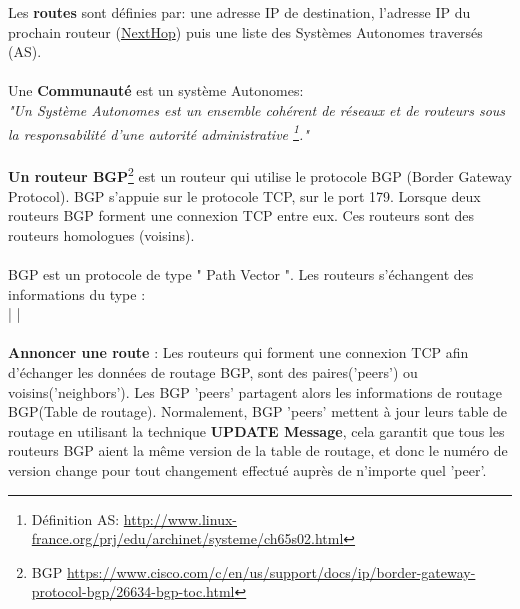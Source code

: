 Les \textbf{routes} sont définies par: une adresse IP de destination, l'adresse IP du prochain routeur (\underline{NextHop}) puis une liste des Systèmes Autonomes traversés (AS).
\\
\\
Une \textbf{Communauté} est un système Autonomes:\\
\textit{"Un Système Autonomes est un ensemble cohérent de réseaux et de routeurs sous la responsabilité d'une autorité administrative \footnote{Définition AS:  \url{http://www.linux-france.org/prj/edu/archinet/systeme/ch65s02.html}}."}
\\
\\
\textbf{Un routeur BGP}\footnote{BGP \url{https://www.cisco.com/c/en/us/support/docs/ip/border-gateway-protocol-bgp/26634-bgp-toc.html}} est un routeur qui utilise le protocole BGP (Border Gateway Protocol). BGP s'appuie sur le protocole TCP, sur le port 179. Lorsque deux routeurs BGP forment une connexion TCP entre eux. Ces routeurs sont des routeurs homologues (voisins). 
\\
\\
BGP est un protocole de type " Path Vector ". Les routeurs s'échangent des informations du type :
\\
 |
 |
\\
\\
\textbf{Annoncer une route} :
\newline
Les routeurs qui forment une connexion TCP afin d'échanger les données de routage BGP, sont des paires('peers') ou voisins('neighbors'). Les BGP 'peers' partagent alors les informations de routage BGP(Table de routage).\newline
Normalement,  BGP 'peers' mettent à jour leurs table de routage en utilisant la technique \textbf{UPDATE Message}, cela garantit que tous les routeurs BGP aient la même version de la table de routage, et donc le numéro de version change pour tout changement effectué auprès de n'importe quel 'peer'.

